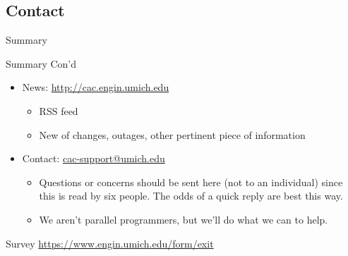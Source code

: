 \documentclass[handout]{beamer}
\begin{document}
\subsection{Contact}
\begin{frame}{Summary}
 \begin{block}{Summary Con'd}
 \begin{itemize}
 \item News: \url{http://cac.engin.umich.edu}
   \begin{itemize}
    \item RSS feed
    \item New of changes, outages, other pertinent piece of information
   \end{itemize}
  \item Contact: \url{cac-support@umich.edu}
   \begin{itemize}
    \item Questions or concerns should be sent here (not to an individual) since
this is read by six people.  The odds of a quick reply are best this way.
    \item We aren't parallel programmers, but we'll do what we can to help.
   \end{itemize}
 \end{itemize}
 \end{block}
 \begin{block}{Survey}
    \url{https://www.engin.umich.edu/form/exit}
 \end{block}
\end{frame}
\end{document}
